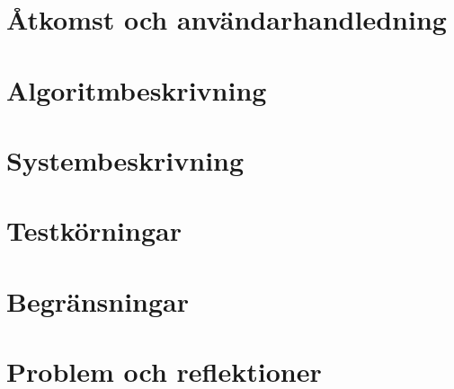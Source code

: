 \documentclass[10pt, titlepage, oneside, a4paper]{article}
\newcommand{\Section}[1]{\section{#1}\vspace{-8pt}}
\newcounter{appendixpage}
\newenvironment{appendices}{
	\setcounter{appendixpage}{\arabic{page}}
	\stepcounter{appendixpage}
}{
}
\newcommand{\appitem}[2]{
	\stepcounter{section}
	\addtocontents{toc}{\protect\contentsline{section}{\numberline{\Alph{section}}#1}{\arabic{appendixpage}}}
	\addtocounter{appendixpage}{#2}
}
\newcommand{\appsubitem}[2]{
	\stepcounter{subsection}
	\addtocontents{toc}{\protect\contentsline{subsection}{\numberline{\Alph{section}.\arabic{subsection}}#1}{\arabic{appendixpage}}}
	\addtocounter{appendixpage}{#2}
}
\begin{document}
	\FloatBarrier
	\Section{Åtkomst och användarhandledning}
			

	\FloatBarrier
	\Section{Algoritmbeskrivning}
	
	
	\FloatBarrier
	\Section{Systembeskrivning}
	

	\FloatBarrier
	\Section{Testkörningar}
	

	\FloatBarrier
	\Section{Begränsningar}
	

	\FloatBarrier
	\Section{Problem och reflektioner}
	
	
		

%
%
\end{document}
